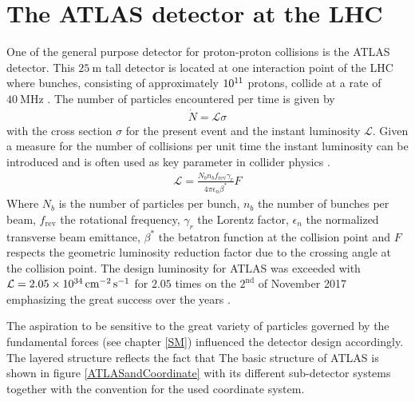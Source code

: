 \section{The ATLAS detector at the LHC}\label{ATLAS}
One of the general purpose detector for proton-proton collisions is the ATLAS detector. This $\SI{25}{\meter}$ tall detector is located at one interaction point of the LHC where bunches, consisting of approximately $\SI{E11}{}$ protons, collide at a rate of $\SI{40}{\mega\hertz}$ \cite{ATLASJINST}. The number of particles encountered per time is given by \cite{Perkins}
\begin{align}
                        \dot{N}=\mathcal{L}\sigma
\end{align}
with the cross section $\sigma$ for the present event and the instant luminosity $\mathcal{L}$. Given a measure for the number of collisions per unit time the instant luminosity can be introduced and is often used as key parameter in collider physics \cite{LHCJINST}.
\begin{align}
                        \mathcal{L}=\frac{N_bn_bf_{\text{rev}}\gamma_r}{4\pi\epsilon_n\beta^*}F
\label{Lumi}
\end{align}
Where $N_b$ is the number of particles per bunch, $n_b$ the number of bunches per beam, $f_{\text{rev}}$ the rotational frequency, $\gamma_r$ the Lorentz factor, $\epsilon_n$ the normalized transverse beam emittance, $\beta^*$ the betatron function at the collision point and $F$ respects the geometric luminosity reduction factor due to the crossing angle at the collision point. The design luminosity for ATLAS was exceeded with $\mathcal{L}=\SI{2.05E34}{\per\square\centi\meter\per\second}$ for $2.05$ times on the $2^{\text{nd}}$ of November 2017 emphasizing the great success over the years \cite{designLumiExceeded}.\par 
The aspiration to be sensitive to the great variety of particles governed by the fundamental forces (see chapter \ref{SM}) influenced the detector design accordingly. The layered structure reflects the fact that
The basic structure of ATLAS is shown in figure \ref{ATLASandCoordinate} with its different sub-detector systems together with the convention for the used coordinate system.  %
%
